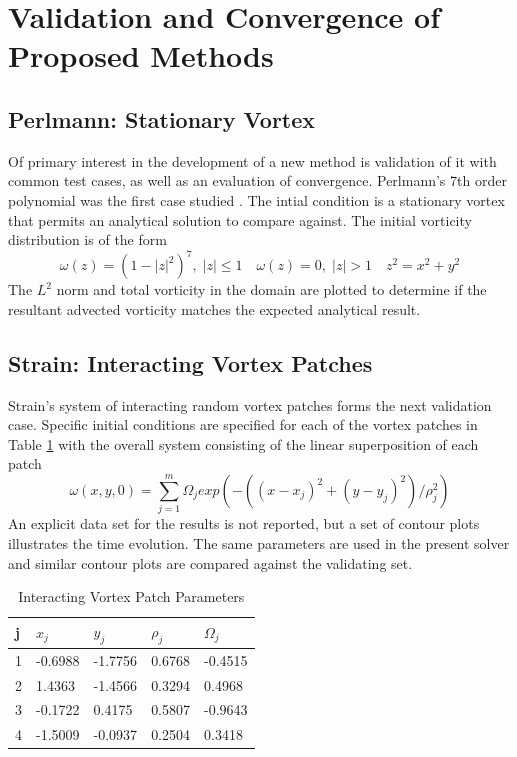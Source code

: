 \documentclass[letterpaper,12pt]{report}
\newcommand{\be}{\begin{equation}}
\newcommand{\ee}{\end{equation}}
\begin{document}
%
\section{Validation and Convergence of Proposed Methods}
\subsection{Perlmann: Stationary Vortex}
Of primary interest in the development of a new method is validation of it with common test cases, as well as an evaluation of convergence. Perlmann's 7th order polynomial was the first case studied \cite{Perlmann1985}. The intial condition is a stationary vortex that permits an analytical solution to compare against. The initial vorticity distribution is of the form
\be \omega(z)=(1-|z|^2)^7, \; |z|\leq 1  \quad \omega(z)=0, \;|z|>1 \quad z^2=x^2+y^2 \ee
The $L^2$ norm and total vorticity in the domain are plotted to determine if the resultant advected vorticity matches the expected analytical result.

\subsection{Strain: Interacting Vortex Patches}
Strain's system of interacting random vortex patches \cite{Strain1996} forms the next validation case. Specific initial conditions are specified for each of the vortex patches in Table \ref{table:StrainTable} with the overall system consisting of the linear superposition of each patch
\be \omega(x,y,0) = \sum_{j=1}^m \Omega_j exp(-((x-x_j)^2 + (y-y_j)^2)/\rho_j^2) \ee
An explicit data set for the results is not reported, but a set of contour plots illustrates the time evolution. The same parameters are used in the present solver and similar contour plots are compared against the validating set.

\begin{table}
\centering
\caption{Interacting Vortex Patch Parameters}\label{table:StrainTable}
\begin{tabular}{lllll}
\hline
j & $x_j$    & $y_j$    & $\rho_j$ & $\Omega_j$ \\ \hline
1 & -0.6988 & -1.7756 & 0.6768  & -0.4515   \\
2 & 1.4363  & -1.4566 & 0.3294  & 0.4968    \\
3 & -0.1722 & 0.4175  & 0.5807  & -0.9643   \\
4 & -1.5009 & -0.0937 & 0.2504  &  0.3418    \\ \hline
\end{tabular}
\end{table}
\end{document}
